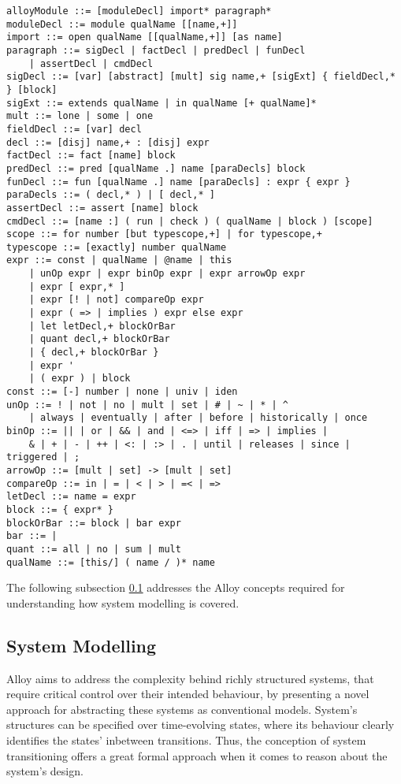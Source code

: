 \begin{lstlisting}[title={Alloy's syntax.}]
alloyModule ::= [moduleDecl] import* paragraph*
moduleDecl ::= module qualName [[name,+]]
import ::= open qualName [[qualName,+]] [as name]
paragraph ::= sigDecl | factDecl | predDecl | funDecl
    | assertDecl | cmdDecl
sigDecl ::= [var] [abstract] [mult] sig name,+ [sigExt] { fieldDecl,* } [block]
sigExt ::= extends qualName | in qualName [+ qualName]*
mult ::= lone | some | one
fieldDecl ::= [var] decl
decl ::= [disj] name,+ : [disj] expr
factDecl ::= fact [name] block
predDecl ::= pred [qualName .] name [paraDecls] block
funDecl ::= fun [qualName .] name [paraDecls] : expr { expr }
paraDecls ::= ( decl,* ) | [ decl,* ]
assertDecl ::= assert [name] block
cmdDecl ::= [name :] ( run | check ) ( qualName | block ) [scope]
scope ::= for number [but typescope,+] | for typescope,+
typescope ::= [exactly] number qualName
expr ::= const | qualName | @name | this
    | unOp expr | expr binOp expr | expr arrowOp expr
    | expr [ expr,* ]
    | expr [! | not] compareOp expr
    | expr ( => | implies ) expr else expr
    | let letDecl,+ blockOrBar
    | quant decl,+ blockOrBar
    | { decl,+ blockOrBar }
    | expr '
    | ( expr ) | block
const ::= [-] number | none | univ | iden
unOp ::= ! | not | no | mult | set | # | ~ | * | ^ 
    | always | eventually | after | before | historically | once
binOp ::= || | or | && | and | <=> | iff | => | implies | 
    & | + | - | ++ | <: | :> | . | until | releases | since | triggered | ;
arrowOp ::= [mult | set] -> [mult | set]
compareOp ::= in | = | < | > | =< | =>
letDecl ::= name = expr
block ::= { expr* }
blockOrBar ::= block | bar expr
bar ::= |
quant ::= all | no | sum | mult
qualName ::= [this/] ( name / )* name
\end{lstlisting}

The following subsection \ref{c:alloy-sm} addresses the Alloy concepts required for understanding how system modelling is covered. 

\subsection{System Modelling}\label{c:alloy-sm}

Alloy aims to address the complexity behind richly structured systems, that require critical control over their intended behaviour, by presenting a novel approach for abstracting these systems as conventional models. System's structures can be specified over time-evolving states, where its behaviour clearly identifies the states' inbetween transitions. Thus, the conception of system transitioning offers a great formal approach when it comes to reason about the system's design.

